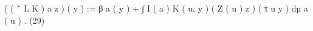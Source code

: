 ( ( ˜ L K ) a z ) ( y ) := β a ( y ) + ∫ I ( a ) K ( u, y ) ( Z ( u ) z ) ( τ u y ) dµ a ( u ) . (29)
